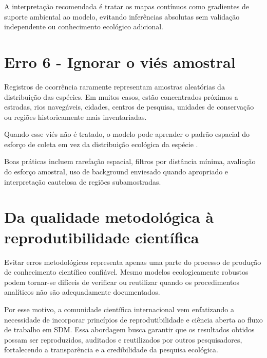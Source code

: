 \documentclass{ueap-sdm}
\begin{document}
A interpretação recomendada é tratar os mapas contínuos como gradientes de
suporte ambiental ao modelo, evitando inferências absolutas sem validação
independente ou conhecimento ecológico adicional.

\section{Erro 6 - Ignorar o viés amostral}

Registros de ocorrência raramente representam amostras aleatórias da
distribuição das espécies. Em muitos casos, estão concentrados próximos a
estradas, rios navegáveis, cidades, centros de pesquisa, unidades de
conservação ou regiões historicamente mais inventariadas.

Quando esse viés não é tratado, o modelo pode aprender o padrão espacial do
esforço de coleta em vez da distribuição ecológica da espécie
\citep{phillips2009sample, kramer2013importance, fourcade2014mapping}.

\begin{center}
\end{center}

Boas práticas incluem rarefação espacial, filtros por distância mínima,
avaliação do esforço amostral, uso de background enviesado quando apropriado e
interpretação cautelosa de regiões subamostradas.

\section{Da qualidade metodológica à reprodutibilidade científica}

Evitar erros metodológicos representa apenas uma parte do processo de produção
de conhecimento científico confiável. Mesmo modelos ecologicamente robustos
podem tornar-se difíceis de verificar ou reutilizar quando os procedimentos
analíticos não são adequadamente documentados.

Por esse motivo, a comunidade científica internacional vem enfatizando a
necessidade de incorporar princípios de reprodutibilidade e ciência aberta ao
fluxo de trabalho em SDM. Essa abordagem busca garantir que os resultados
obtidos possam ser reproduzidos, auditados e reutilizados por outros
pesquisadores, fortalecendo a transparência e a credibilidade da pesquisa
ecológica.
\end{document}
